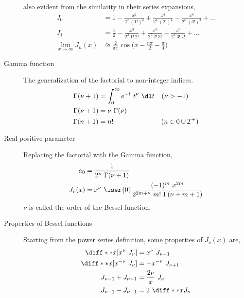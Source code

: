 \begin{description}
        also evident from the similarity in their series expansions,
        \begin{align}
            J_0                       & = 1 - \frac{x^2}{2^2\ (1!)^2}
            + \frac{x^4}{2^4\ (2!)^2} - \frac{x^6}{2^6\ (3!)^2} + \dots         \\
            J_1                       & = \frac{x}{2} - \frac{x^3}{2^3\ 1!\ 2!}
            + \frac{x^5}{2^5\ 2!\ 3!} - \frac{x^7}{2^7\ 3!\ 4!} + \dots         \\
            \lim_{x \to \infty}J_n(x) & \approxeq \frac{2}{\pi x}
            \cos \Bigg( x - \frac{n\pi}{2} - \frac{\pi}{4} \Bigg)
        \end{align}
    \item[Gamma function] The generalization of the factorial to non-integer indices.
        \begin{align}
            \Gamma(\nu+1) & = \int_{0}^{\infty}e^{-t}\ t^{\nu}\ \dl t &
            (\nu          & > -1)                                       \\
            \Gamma(\nu+1) & = \nu\ \Gamma(\nu)                          \\
            \Gamma(n+1)   & = n!                                      &
            (n            & \in 0 \cup \mathcal{I^+})
        \end{align}
    \item[Real positive parameter] Replacing the factorial with the Gamma function,
        \begin{align}
            a_0        & = \frac{1}{2^{\nu}\ \Gamma(\nu+1)}        \\
            J_{\nu}(x) & = x^{\nu}\ \iser{0} \frac{(-1)^m\ x^{2m}}
            {2^{2m + \nu}\ m!\ \Gamma(\nu+m+1)}
        \end{align}
        $ \nu $ is called the order of the Bessel function.
    \item[Properties of Bessel functions] Starting from the power series definition,
        some properties of $ J_{\nu}(x) $ are,
        \begin{align}
            \diff**{x}{[x^{\nu}\ J_{\nu}]}  & = x^{\nu}\ J_{\nu - 1}    \\
            \diff**{x}{[x^{-\nu}\ J_{\nu}]} & = -x^{-\nu}\ J_{\nu + 1}  \\
            J_{\nu-1} + J_{\nu+1}           & = \frac{2\nu}{x}\ J_{\nu} \\
            J_{\nu-1} - J_{\nu+1}           & = 2\ \diff**{x}{J_{\nu}}
        \end{align}

\end{description}
